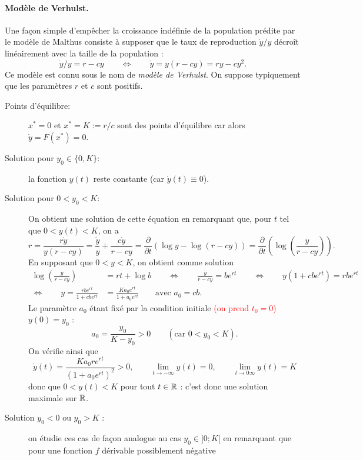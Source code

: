 \paragraph*{Modèle de Verhulst.}
Une façon simple d'empêcher la croissance indéfinie de la population prédite par le modèle de Malthus consiste à supposer que le taux de reproduction $\dot y / y$ décroît linéairement avec la taille de la population : 
$$
\dot y / y = r - cy
\qquad \Leftrightarrow \qquad
\dot y = y(r - cy) = ry - c y^2.
$$
Ce modèle est connu sous le nom de {\em modèle de Verhulst}. On suppose typiquement que les paramètres $r$ et $c$ sont positifs.
\begin{description}
  \item[Points d'équilibre:] $x^* = 0$ et $x^* = K := r/c$ sont des points d'équilibre car alors $\dot y = F(x^*) = 0$.
  \item[Solution pour $y_0 \in \{0, K\}$:] la fonction $y(t)$ reste constante (car $\dot y(t) \equiv 0$).
  \item[Solution pour $0 < y_0 < K$:]
  On obtient une solution de cette équation en remarquant que, pour $t$ tel que $0 < y(t) < K$, on a
  $$
  r 
  = \frac{r \dot y}{y(r - cy)}
  = \frac{\dot y}{y} + \frac{c \dot y}{r - cy}
  = \frac{\partial}{\partial t} \left(\log y - \log (r - cy) \right)
  = \frac{\partial}{\partial t} \left(\log \left(\frac{y}{r - cy}\right)\right).
  $$
  En supposant que $0 < y < K$, on obtient comme solution 
  \begin{align*}
    \log \left(\frac{y}{r - cy}\right) & = rt + \log b
    \qquad \Leftrightarrow \qquad 
    \frac{y}{r - cy} = b e^{rt}
    \qquad \Leftrightarrow \qquad
    y(1 + c b e^{rt}) = r b e^{rt} \\
    \Leftrightarrow \qquad 
    y = \frac{rb e^{rt}}{1 + cb e^{rt}} & = \frac{K a_0 e^{rt}}{1 + a_0 e^{rt}}
    \qquad \text{avec } a_0 = cb.
  \end{align*}
  Le paramètre $a_0$ étant fixé par la condition initiale \textcolor{red}{(on prend $t_0 = 0$)} $y(0) = y_0$ : 
  $$
  a_0 = \frac{y_0}{K-y_0} > 0 \qquad (\text{car } 0  < y_0 < K).
  $$
  On vérifie ainsi que 
  $$
  \dot y(t) = \frac{Ka_0 r e^{rt}}{(1 + a_0 e^{rt})^2} > 0, 
  \qquad 
  \lim_{t \rightarrow -\infty} y(t) = 0, 
  \qquad
  \lim_{t \rightarrow 0\infty} y(t) = K
  $$
  donc que $0 < y(t) < K$ pour tout $t \in \mathbb{R}$ : c'est donc une solution maximale sur $\mathbb{R}$. \\
  \item[Solution $y_0 < 0$ ou $y_0 > K$ :] on étudie ces cas de façon analogue au cas $y_0 \in ]0; K[$ en remarquant que pour une fonction $f$ dérivable possiblement négative 

\end{description}
